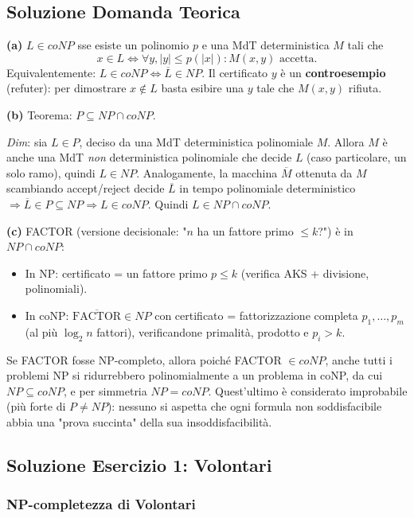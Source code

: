 \documentclass{report}
\begin{document}
\subsection*{Soluzione Domanda Teorica}

\textbf{(a)} $L \in coNP$ sse esiste un polinomio $p$ e una MdT deterministica $M$ tali che
\[
  x \in L \iff \forall y, |y| \leq p(|x|) : M(x, y) \text{ accetta}.
\]
Equivalentemente: $L \in coNP \iff \overline{L} \in NP$. Il certificato $y$ è un \textbf{controesempio} (refuter): per dimostrare $x \notin L$ basta esibire una $y$ tale che $M(x, y)$ rifiuta.

\textbf{(b)} Teorema: $P \subseteq NP \cap coNP$.

\emph{Dim}: sia $L \in P$, deciso da una MdT deterministica polinomiale $M$. Allora $M$ è anche una MdT \emph{non} deterministica polinomiale che decide $L$ (caso particolare, un solo ramo), quindi $L \in NP$. Analogamente, la macchina $\overline{M}$ ottenuta da $M$ scambiando accept/reject decide $\overline{L}$ in tempo polinomiale deterministico $\Rightarrow \overline{L} \in P \subseteq NP \Rightarrow L \in coNP$. Quindi $L \in NP \cap coNP$.

\textbf{(c)} FACTOR (versione decisionale: "$n$ ha un fattore primo $\leq k$?") è in $NP \cap coNP$:
\begin{itemize}
  \item In NP: certificato = un fattore primo $p \leq k$ (verifica AKS + divisione, polinomiali).
  \item In coNP: $\overline{\text{FACTOR}} \in NP$ con certificato = fattorizzazione completa $p_1, \ldots, p_m$ (al più $\log_2 n$ fattori), verificandone primalità, prodotto e $p_i > k$.
\end{itemize}
Se FACTOR fosse NP-completo, allora poiché FACTOR $\in coNP$, anche tutti i problemi NP si ridurrebbero polinomialmente a un problema in coNP, da cui $NP \subseteq coNP$, e per simmetria $NP = coNP$. Quest'ultimo è considerato improbabile (più forte di $P \neq NP$): nessuno si aspetta che ogni formula non soddisfacibile abbia una "prova succinta" della sua insoddisfacibilità.

\subsection*{Soluzione Esercizio 1: Volontari}

\subsubsection*{NP-completezza di Volontari}
\end{document}

